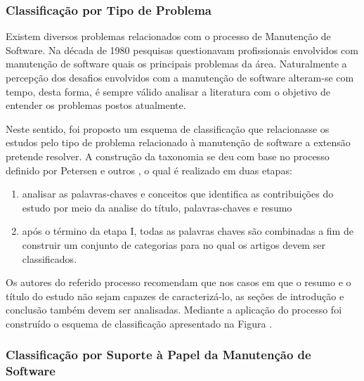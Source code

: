\documentclass[msc]{ppgccufmg} %
\begin{document}
\subsubsection{Classificação por Tipo de Problema}
\label{subsubsec:map-esquema-suporte-problema}

Existem diversos problemas relacionados com o processo de Manutenção de Software. Na década de 1980 pesquisas questionavam profissionais envolvidos com manutenção de software quais os principais problemas da área\cite{Lientz:1981:PAS:358790.358796}. Naturalmente a percepção dos desafios envolvidos com a manutenção de software alteram-se com tempo, desta forma, é sempre válido analisar a literatura com o objetivo de entender os problemas postos atualmente.

Neste sentido, foi proposto um esquema de classificação que relacionasse os estudos pelo tipo de problema relacionado à manutenção de software a extensão pretende resolver. A construção da taxonomia se deu com base no processo definido por Petersen e outros \cite{Petersen2008}, o qual é realizado em duas etapas:

\begin{enumerate}[I] 
	\item analisar as palavras-chaves e conceitos que identifica as contribuições do estudo por meio da analise do título, palavras-chaves e resumo
	\item após o término da etapa I, todas as palavras chaves são combinadas a fim de construir um conjunto de categorias para no qual os artigos devem ser classificados.
\end{enumerate} 

Os autores do referido processo recomendam que nos casos em que o resumo e o
título do estudo não sejam capazes de caracterizá-lo, as seções de introdução e
conclusão também devem ser analisadas. Mediante a aplicação do processo foi
construído o esquema de classificação apresentado na Figura  .


\subsubsection{Classificação por Suporte à Papel da Manutenção de Software}
\label{subsubsec:map-esquema-suporte-papel-man}
\end{document}
